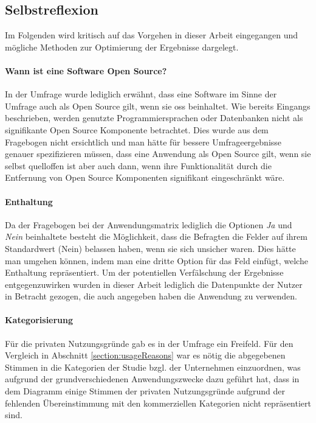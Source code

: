 \documentclass[a4paper]{article}
\begin{document}
        \subsection{Selbstreflexion}\label{section:selbstreflexion}
            Im Folgenden wird kritisch auf das Vorgehen in dieser Arbeit eingegangen und mögliche Methoden zur Optimierung der Ergebnisse dargelegt.
            \paragraph{Wann ist eine Software Open Source?}
                In der Umfrage wurde lediglich erwähnt, dass eine Software im Sinne der Umfrage auch als Open Source gilt, wenn sie \gls{oss} beinhaltet. Wie bereits Eingangs beschrieben, werden genutzte Programmiersprachen oder Datenbanken nicht als signifikante Open Source Komponente betrachtet. Dies wurde aus dem Fragebogen nicht ersichtlich und man hätte für bessere Umfrageergebnisse genauer spezifizieren müssen, dass eine Anwendung als Open Source gilt, wenn sie selbst quelloffen ist aber auch dann, wenn ihre Funktionalität durch die Entfernung von Open Source Komponenten signifikant eingeschränkt wäre.
                
            \paragraph{Enthaltung}
                Da der Fragebogen bei der Anwendungsmatrix lediglich die Optionen \emph{Ja} und \emph{Nein} beinhaltete besteht die Möglichkeit, dass die Befragten die Felder auf ihrem Standardwert ({\scriptsize Nein}) belassen haben, wenn sie sich unsicher waren. Dies hätte man umgehen können, indem man eine dritte Option für das Feld einfügt, welche Enthaltung repräsentiert. Um der potentiellen Verfälschung der Ergebnisse entgegenzuwirken wurden in dieser Arbeit lediglich die Datenpunkte der Nutzer in Betracht gezogen, die auch angegeben haben die Anwendung zu verwenden.
                
            \paragraph{Kategorisierung}
                Für die privaten Nutzungsgründe gab es in der Umfrage ein Freifeld. Für den Vergleich in Abschnitt \ref{section:usageReasons} war es nötig die abgegebenen Stimmen in die Kategorien der Studie bzgl. der Unternehmen einzuordnen, was aufgrund der grundverschiedenen Anwendungszwecke dazu geführt hat, dass in dem Diagramm einige Stimmen der privaten Nutzungsgründe aufgrund der fehlenden Übereinstimmung mit den kommerziellen Kategorien nicht repräsentiert sind.
                
\end{document}
